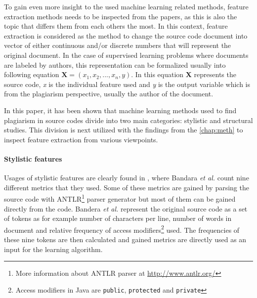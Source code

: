 \documentclass[english]{tktltiki2}
\theoremstyle{definition}
\theoremstyle{remark}
\begin{document}
To gain even more insight to the used machine learning related methods,  feature extraction methods needs to be inspected from the papers, as this is also the topic that differs them from each others the most. In this context, feature extraction is considered as the method to change the source code document into vector of either continuous and/or discrete numbers that will represent the original document. In the case of supervised learning problems where documents are labeled by authors, this representation can be formalized usually into following equation $\mathbf{X} = (x_1, x_2,...,x_n, y)$. In this equation \textbf{X} represents the source code, \emph{x} is the individual feature used and \emph{y} is the output variable which is from the plagiarism perspective, usually the author of the document. 

In this paper, it has been shown that machine learning methods used to find plagiarism in source codes divide into two main categories: stylistic and structural studies. This division is next utilized with the findings from the \autoref{chap:meth} to inspect feature extraction from various viewpoints. %

\paragraph{Stylistic features}
Usages of stylistic features are clearly found in \cite{bandara2011machine}, where Bandara \textit{et al.} count nine different metrics that they used. Some of these metrics are gained by parsing the source code with ANTLR\footnote{More information about ANTLR parser at \url{http://www.antlr.org/}} parser generator but most of them can be gained directly from the code. Bandera \textit{et al.} represent the original source code as a set of tokens as for example  number of characters per line, number of words in document and relative frequency of access modifiers\footnote{Access modifiers in Java are \texttt{public}, \texttt{protected} and \texttt{private}} used.  The frequencies of these nine tokens are then calculated and gained metrics are directly used as an input for the learning algorithm. 
\end{document}
